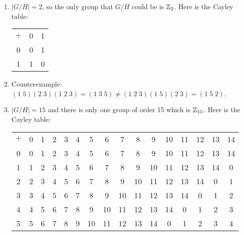 \documentclass[12pt]{report}
\begin{document}
\sol
\begin{enumerate}[label=\alph*.]
    \item $|G/H| = 2$, so the only group that $G/H$ could be is $\ZZ_2$. Here is the Cayley table:
    \begin{center}
        \noindent\begin{tabular}{c | c c}
        $+$ & 0 & 1  \\
        \cline{1-3}
        0 & 0 & 1 \\
        1 & 1 & 0
        \end{tabular}
    \end{center}
    \item Counterexample: $(1 \; 5)(2 \; 3)(1 \; 2 \; 3) = (1 \; 3 \; 5) \neq (1 \; 2 \; 3)(1 \; 5)(2 \; 3) = (1 \; 5 \; 2)$. 
    \item $|G/H| = 15$ and there is only one group of order 15 which is $\ZZ_{15}$. Here is the Cayley table:
    \begin{center}
        \noindent\begin{tabular}{c | c c c c c c c c c c c c c c c}
        $+$ & 0 & 1 & 2 & 3 & 4 & 5 & 6 & 7 & 8 & 9 & 10 & 11 & 12 & 13 & 14  \\
        \cline{1-16}
        0 & 0 & 1 & 2 & 3 & 4 & 5 & 6 & 7 & 8 & 9 & 10 & 11 & 12 & 13 & 14 \\
        1 & 1 & 2 & 3 & 4 & 5 & 6 & 7 & 8 & 9 & 10 & 11 & 12 & 13 & 14 & 0 \\
        2 & 2 & 3 & 4 & 5 & 6 & 7 & 8 & 9 & 10 & 11 & 12 & 13 & 14 & 0 & 1 \\
        3 & 3 & 4 & 5 & 6 & 7 & 8 & 9 & 10 & 11 & 12 & 13 & 14 & 0 & 1 & 2 \\
        4 & 4 & 5 & 6 & 7 & 8 & 9 & 10 & 11 & 12 & 13 & 14 & 0 & 1 & 2 & 3 \\
        5 & 5 & 6 & 7 & 8 & 9 & 10 & 11 & 12 & 13 & 14 & 0 & 1 & 2 & 3 & 4 \\

\end{tabular}
\end{center}
\end{enumerate}
\end{document}
